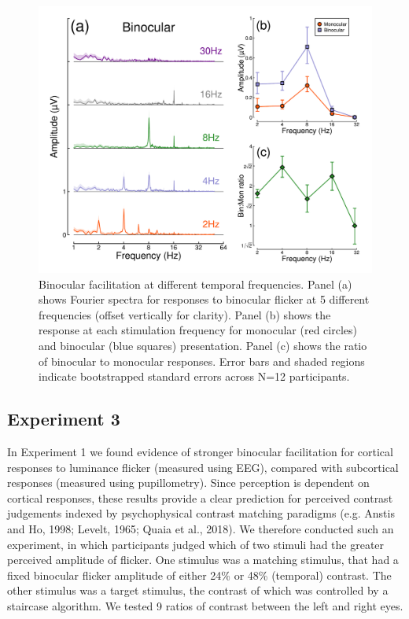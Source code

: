 \documentclass[
]{article}
\begin{document}
\begin{figure}

{\centering \includegraphics{Figures/TFdata} 

}

\caption{Binocular facilitation at different temporal frequencies. Panel (a) shows Fourier spectra for responses to binocular flicker at 5 different frequencies (offset vertically for clarity). Panel (b) shows the response at each stimulation frequency for monocular (red circles) and binocular (blue squares) presentation. Panel (c) shows the ratio of binocular to monocular responses. Error bars and shaded regions indicate bootstrapped standard errors across N=12 participants.}\label{fig:TFdata}
\end{figure}

\hypertarget{experiment-3}{%
\subsection{Experiment 3}\label{experiment-3}}

In Experiment 1 we found evidence of stronger binocular facilitation for cortical responses to luminance flicker (measured using EEG), compared with subcortical responses (measured using pupillometry). Since perception is dependent on cortical responses, these results provide a clear prediction for perceived contrast judgements indexed by psychophysical contrast matching paradigms (e.g. Anstis and Ho, 1998; Levelt, 1965; Quaia et al., 2018). We therefore conducted such an experiment, in which participants judged which of two stimuli had the greater perceived amplitude of flicker. One stimulus was a matching stimulus, that had a fixed binocular flicker amplitude of either 24\% or 48\% (temporal) contrast. The other stimulus was a target stimulus, the contrast of which was controlled by a staircase algorithm. We tested 9 ratios of contrast between the left and right eyes.
\end{document}
